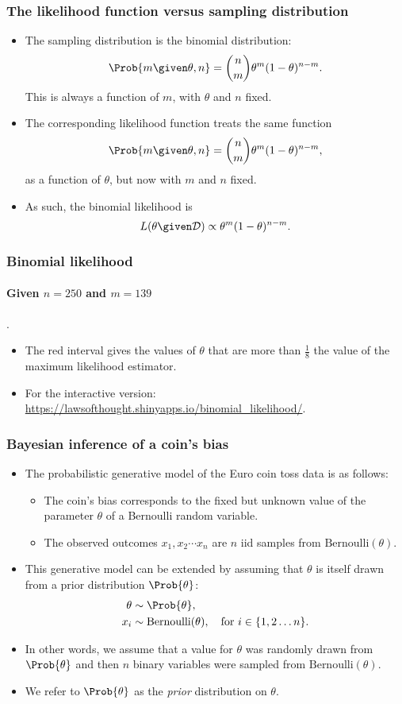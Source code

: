 \documentclass{slides}
\begin{document}
\begin{frame}
	\frametitle{The likelihood function versus sampling distribution}
		\begin{itemize}
			\item The sampling distribution is the binomial distribution:
				\[\Prob{m \given \theta,n} = \binom{n}{m} \theta^m (1-\theta)^{n-m}.\]
				This is always a function of $m$, with $\theta$ and $n$ fixed.
			\item The corresponding likelihood function treats the same function
		\[\Prob{m \given \theta,n} = \binom{n}{m} \theta^m (1-\theta)^{n-m},\] 
				as a function of $\theta$, but now with $m$ and $n$ fixed.
			\item As such, the binomial likelihood is 
				\[L(\theta\given\mathcal{D}) \propto \theta^m (1-\theta)^{n-m}.\]
\end{itemize}
\end{frame}



\begin{frame}
	\frametitle{Binomial likelihood}
	\framesubtitle{Given $n=250$ and $m=139$}.
	
	{\small
	\begin{itemize}
		\item The red interval gives the values of $\theta$ that are more than $\tfrac{1}{8}$ the value of the maximum likelihood estimator.
	\item For the interactive version: \url{https://lawsofthought.shinyapps.io/binomial_likelihood/}.
	\end{itemize}
	}
\end{frame}

\begin{frame}
	\frametitle{Bayesian inference of a coin's bias}
	\begin{itemize}
		\item The probabilistic generative model of the Euro coin toss data is as follows:
			\begin{itemize}
				\item The coin's bias corresponds to the fixed but unknown value of the parameter $\theta$ of a Bernoulli random variable.
				\item The observed outcomes $x_1, x_2 \cdots x_n$ are $n$ iid samples from $\textrm{Bernoulli}(\theta)$.
			\end{itemize}
		\item This generative model can be extended by assuming that $\theta$ is itself drawn from a prior distribution $\Prob{\theta}$:
			\begin{align*}
				\theta &\sim \Prob{\theta},\\
				x_i &\sim \textrm{Bernoulli}(\theta),\quad\text{for $i \in \{1,2\ldots n\}$.}
			\end{align*}
		\item In other words, we assume that a value for $\theta$ was randomly drawn from $\Prob{\theta}$ and then $n$ binary variables were sampled from $\textrm{Bernoulli}(\theta)$.
		\item We refer to $\Prob{\theta}$ as the \emph{prior} distribution on $\theta$.
	\end{itemize}
\end{frame}
\end{document}
